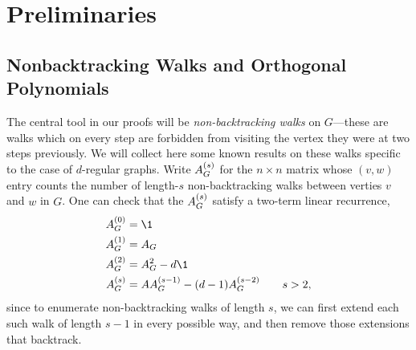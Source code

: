 \section{Preliminaries}
\label{sec:prelims}

\subsection{Nonbacktracking Walks and Orthogonal Polynomials}  \label{sec:nbw-poly}
The central tool in our proofs will be \emph{non-backtracking walks} on $G$---these are walks which on every step are forbidden from visiting the vertex they were at two steps previously. We will collect here some known results on these walks specific to the case of $d$-regular graphs. Write $A^{(s)}_{G}$ for the $n\times n$ matrix whose $(v,w)$ entry counts the number of length-$s$ non-backtracking walks between verties $v$ and $w$ in $G$. One can check that the $A^{(s)}_{G}$ satisfy a two-term linear recurrence,
\begin{align*}
	\nb{0}{G} &= \1 \\
	\nb{1}{G} &= A_{G} \\
	\nb{2}{G} &= A^2_{G} - d\1 \\
	\nb{s}{G} &= A\nb{s-1}{G} - (d-1)\nb{s-2}{G} \qquad s > 2,
\end{align*}
since to enumerate non-backtracking walks of length $s$, we can first extend each such walk of length $s-1$ in every possible way, and then remove those extensions that backtrack.

